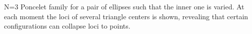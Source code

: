 N=3 Poncelet family for a pair of ellipses such that the inner one is varied. At each moment the loci of several triangle centers is shown, revealing that certain configurations can collapse loci to points.